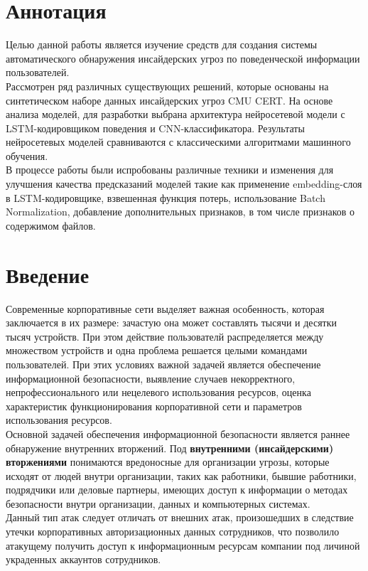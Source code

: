 
\chapter{Аннотация}

Целью данной работы является изучение средств для создания системы автоматического обнаружения инсайдерских угроз по поведенческой информации пользователей.\\
Рассмотрен ряд различных существующих решений, которые основаны на синтетическом наборе данных инсайдерских угроз CMU CERT. На основе анализа моделей, для разработки выбрана архитектура нейросетевой модели с LSTM-кодировщиком поведения и CNN-классификатора. Результаты нейросетевых моделей сравниваются с классическими алгоритмами машинного обучения.\\
В процессе работы были испробованы различные техники и изменения для улучшения качества предсказаний моделей такие как применение embedding-слоя в LSTM-кодировщике, взвешенная функция потерь, использование Batch Normalization, добавление дополнительных признаков, в том числе признаков о содержимом файлов.

\chapter{Введение}

Современные корпоративные сети выделяет важная особенность, которая заключается в их размере: зачастую она может составлять тысячи и десятки тысяч устройств. При этом действие пользователй распределяется между множеством устройств и одна проблема решается целыми командами пользователей. При этих условиях важной задачей является обеспечение информационной безопасности, выявление случаев некорректного, непрофессионального или нецелевого использования ресурсов, оценка характеристик функционирования корпоративной сети и параметров использования ресурсов.\\

Основной задачей обеспечения информационной безопасности является раннее обнаружение внутренних вторжений. Под \textbf{внутренними (инсайдерскими) вторжениями} понимаются вредоносные для организации угрозы, которые исходят от людей внутри организации, таких как работники, бывшие работники, подрядчики или деловые партнеры, имеющих доступ к информации о методах безопасности внутри организации, данных и компьютерных системах.\\

Данный тип атак следует отличать от внешних атак, произошедших в следствие утечки корпоративных авторизационных данных сотрудников, что позволило атакущему получить доступ к информационным ресурсам компании под личиной украденных аккаунтов сотрудников.\\


